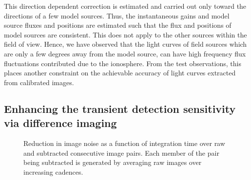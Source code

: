 \documentclass[referee]{aa}
\begin{document}
This direction dependent correction is estimated and carried out only toward the
directions  of a  few model  sources. Thus,  the instantaneous  gains  and model
source fluxes  and positions are estimated  such that the flux  and positions of
model sources  are consistent. This does  not apply to the  other sources within
the  field of  view. Hence,  we have  observed that  the light  curves  of field
sources which are  only a few degrees  away from the model source,  can have high
frequency flux  fluctuations contributed  due to the  ionosphere. From  the test
observations, this places another constraint on the achievable accuracy of light
curves extracted from calibrated images.


\subsection{\label{sub:Enhancing-the-transient}Enhancing the transient detection
sensitivity via difference imaging} 

\begin{figure}[h]
\caption{\label{fig:Reduction-in-image}Reduction in image noise as a function of
  integration  time over  raw  and subtracted  consecutive  image pairs.   Each
  member of the pair being subtracted is generated by averaging raw images over
  increasing  cadences.}
\end{figure}
\end{document}
